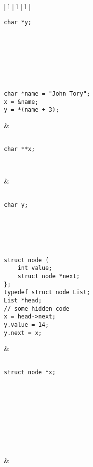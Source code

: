 \documentclass[11pt]{article}
\begin{document}
\begin{enumerate}
\begin{tabular}[c]{| l | l | l |}
\begin{minipage}{0.3\textwidth}
\begin{Verbatim}
char *y;





				\end{Verbatim}
			\end{minipage}\\
			\hline
			\begin{minipage}{0.3\textwidth}
				\begin{Verbatim}

char *name = "John Tory";
x = &name;
y = *(name + 3);

				\end{Verbatim}
			\end{minipage} &
			\begin{minipage}{0.3\textwidth}
				\begin{Verbatim}

char **x;



				\end{Verbatim}
			\end{minipage} &
			\begin{minipage}{0.3\textwidth}
				\begin{Verbatim}

char y;



				\end{Verbatim}
			\end{minipage}\\
			\hline
			\begin{minipage}{0.3\textwidth}
				\begin{Verbatim}

struct node {
	int value;
	struct node *next;
};
typedef struct node List;
List *head;
// some hidden code
x = head->next;
y.value = 14;
y.next = x;

				\end{Verbatim}
			\end{minipage} &
			\begin{minipage}{0.3\textwidth}
				\begin{Verbatim}

struct node *x;










				\end{Verbatim}
			\end{minipage} &
			\begin{minipage}{0.3\textwidth}
				\begin{Verbatim}


\end{Verbatim}
\end{minipage}
\end{tabular}
\end{enumerate}
\end{document}
